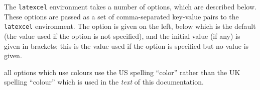 \documentclass[table]{article}
\newcommand{\semibold}[1]{{\firabook #1}}
\newcommand{\emphasis}[1]{{\color{Red}\semibold{#1}}}
\begin{document}
The \texttt{latexcel} environment takes a number of options, which are described below. These options are passed as a set of comma-separated key-value pairs to the \texttt{latexcel} environment. The option is given on the left, below which is the default (the value used if the option is not specified), and the initial value (if any) is given in brackets; this is the value used if the option is specified but no value is given.

\emphasis{Note:} all options which use colours use the US spelling ``color'' rather than the UK spelling ``colour'' which is used in the \textit{text} of this documentation.

\end{document}
